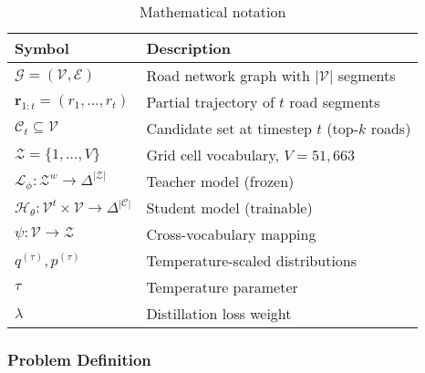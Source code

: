 \begin{table}[h]
    \centering
    \caption{Mathematical notation}
    \label{tab:notation}
    \begin{tabular}{ll}
        \toprule
        \textbf{Symbol}                                                                    & \textbf{Description}                             \\
        \midrule
        $\mathcal{G} = (\mathcal{V}, \mathcal{E})$                                         & Road network graph with $|\mathcal{V}|$ segments \\
        $\mathbf{r}_{1:t} = (r_1, \ldots, r_t)$                                            & Partial trajectory of $t$ road segments          \\
        $\mathcal{C}_t \subseteq \mathcal{V}$                                              & Candidate set at timestep $t$ (top-$k$ roads)    \\
        $\mathcal{Z} = \{1, \ldots, V\}$                                                   & Grid cell vocabulary, $V = 51{,}663$             \\
        \midrule
        $\mathcal{L}_\phi : \mathcal{Z}^w \to \Delta^{|\mathcal{Z}|}$                      & Teacher model (frozen)                           \\
        $\mathcal{H}_\theta : \mathcal{V}^t \times \mathcal{V} \to \Delta^{|\mathcal{C}|}$ & Student model (trainable)                        \\
        $\psi : \mathcal{V} \to \mathcal{Z}$                                               & Cross-vocabulary mapping                         \\
        $q^{(\tau)}, p^{(\tau)}$                                                           & Temperature-scaled distributions                 \\
        $\tau$                                                                             & Temperature parameter                            \\
        $\lambda$                                                                          & Distillation loss weight                         \\
        \bottomrule
    \end{tabular}
\end{table}

\subsubsection{Problem Definition}
\label{sec:method-problem}

